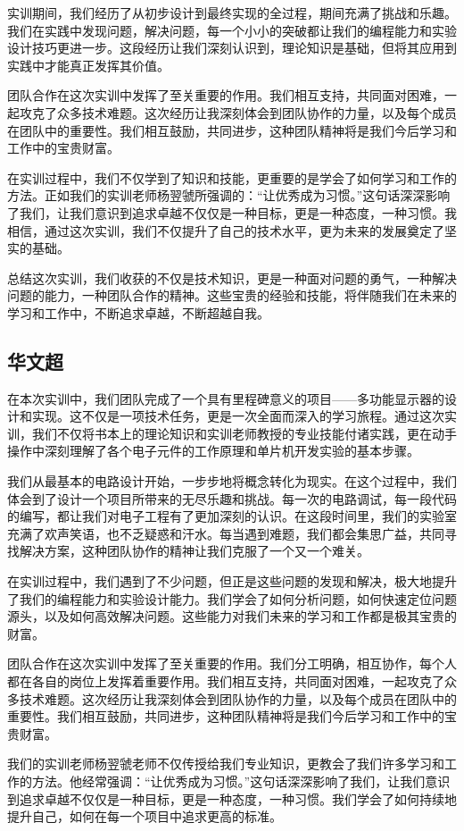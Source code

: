 \documentclass{textreportclass}  %
\begin{document}
	实训期间，我们经历了从初步设计到最终实现的全过程，期间充满了挑战和乐趣。我们在实践中发现问题，解决问题，每一个小小的突破都让我们的编程能力和实验设计技巧更进一步。这段经历让我们深刻认识到，理论知识是基础，但将其应用到实践中才能真正发挥其价值。
	
	团队合作在这次实训中发挥了至关重要的作用。我们相互支持，共同面对困难，一起攻克了众多技术难题。这次经历让我深刻体会到团队协作的力量，以及每个成员在团队中的重要性。我们相互鼓励，共同进步，这种团队精神将是我们今后学习和工作中的宝贵财富。
	
	在实训过程中，我们不仅学到了知识和技能，更重要的是学会了如何学习和工作的方法。正如我们的实训老师杨翌虢所强调的：“让优秀成为习惯。”这句话深深影响了我们，让我们意识到追求卓越不仅仅是一种目标，更是一种态度，一种习惯。我相信，通过这次实训，我们不仅提升了自己的技术水平，更为未来的发展奠定了坚实的基础。
	
	总结这次实训，我们收获的不仅是技术知识，更是一种面对问题的勇气，一种解决问题的能力，一种团队合作的精神。这些宝贵的经验和技能，将伴随我们在未来的学习和工作中，不断追求卓越，不断超越自我。
	\
	\subsection{华文超}
	在本次实训中，我们团队完成了一个具有里程碑意义的项目——多功能显示器的设计和实现。这不仅是一项技术任务，更是一次全面而深入的学习旅程。通过这次实训，我们不仅将书本上的理论知识和实训老师教授的专业技能付诸实践，更在动手操作中深刻理解了各个电子元件的工作原理和单片机开发实验的基本步骤。
	
	我们从最基本的电路设计开始，一步步地将概念转化为现实。在这个过程中，我们体会到了设计一个项目所带来的无尽乐趣和挑战。每一次的电路调试，每一段代码的编写，都让我们对电子工程有了更加深刻的认识。在这段时间里，我们的实验室充满了欢声笑语，也不乏疑惑和汗水。每当遇到难题，我们都会集思广益，共同寻找解决方案，这种团队协作的精神让我们克服了一个又一个难关。
	
	在实训过程中，我们遇到了不少问题，但正是这些问题的发现和解决，极大地提升了我们的编程能力和实验设计能力。我们学会了如何分析问题，如何快速定位问题源头，以及如何高效解决问题。这些能力对我们未来的学习和工作都是极其宝贵的财富。
	
	团队合作在这次实训中发挥了至关重要的作用。我们分工明确，相互协作，每个人都在各自的岗位上发挥着重要作用。我们相互支持，共同面对困难，一起攻克了众多技术难题。这次经历让我深刻体会到团队协作的力量，以及每个成员在团队中的重要性。我们相互鼓励，共同进步，这种团队精神将是我们今后学习和工作中的宝贵财富。
	
	我们的实训老师杨翌虢老师不仅传授给我们专业知识，更教会了我们许多学习和工作的方法。他经常强调：“让优秀成为习惯。”这句话深深影响了我们，让我们意识到追求卓越不仅仅是一种目标，更是一种态度，一种习惯。我们学会了如何持续地提升自己，如何在每一个项目中追求更高的标准。
	
\end{document}
